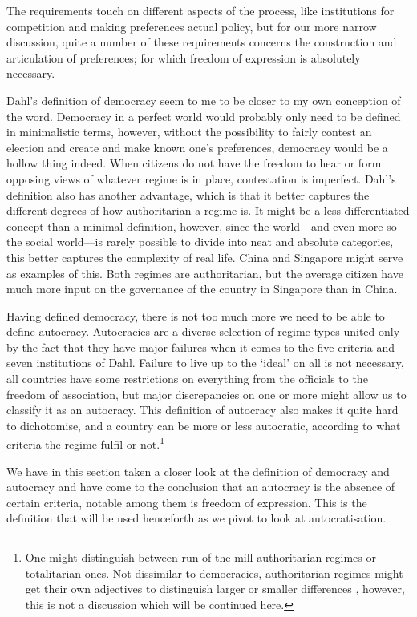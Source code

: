 The requirements touch on different aspects of the process, like institutions for competition and making preferences actual policy, but for our more narrow discussion, quite a number of these requirements concerns the construction and articulation of preferences; for which freedom of expression is absolutely necessary.

Dahl's definition of democracy seem to me to be closer to my own conception of the word. Democracy in a perfect world would probably only need to be defined in minimalistic terms, however, without the possibility to fairly contest an election and create and make known one's preferences, democracy would be a hollow thing indeed. When citizens do not have the freedom to hear or form opposing views of whatever regime is in place, contestation is imperfect. Dahl's definition also has another advantage, which is that it better captures the different degrees of how authoritarian a regime is. It might be a less differentiated concept than a minimal definition, however, since the world---and even more so the social world---is rarely possible to divide into neat and absolute categories, this better captures the complexity of real life. China and Singapore might serve as examples of this. Both regimes are authoritarian, but the average citizen have much more input on the governance of the country in Singapore than in China. 

Having defined democracy, there is not too much more we need to be able to define autocracy. Autocracies are a diverse selection of regime types united only by the fact that they have major failures when it comes to the five criteria and seven institutions of Dahl. Failure to live up to the `ideal' on all is not necessary, all countries have some restrictions on everything from the officials to the freedom of association, but major discrepancies on one or more might allow us to classify it as an autocracy. This definition of autocracy also makes it quite hard to dichotomise, and a country can be more or less autocratic, according to what criteria the regime fulfil or not.\footnote{One might distinguish between run-of-the-mill authoritarian regimes or totalitarian ones. Not dissimilar to democracies, authoritarian regimes might get their own adjectives to distinguish larger or smaller differences \citep{collier_democracy_1997}, however, this is not a discussion which will be continued here.}

We have in this section taken a closer look at the definition of democracy and autocracy and have come to the conclusion that an autocracy is the absence of certain criteria, notable among them is freedom of expression. This is the definition that will be used henceforth as we pivot to look at autocratisation. 

